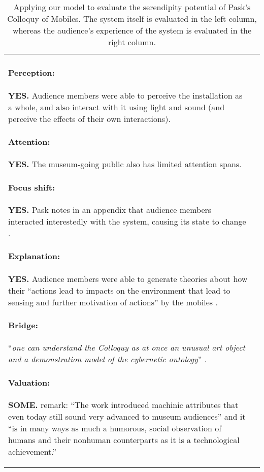 \begin{table}
\begin{mdframed}
\begin{tabular}{@{\hspace{-0.01\textwidth}}p{}@{\hspace{.02\textwidth}}p{}}
\begin{minipage}{.48\textwidth}
\paragraph{Perception:} \textbf{YES.}
Audience members were able to perceive the installation as a whole,
and also interact with it using light and sound (and perceive the
effects of their own interactions). 
\paragraph{Attention:} \textbf{YES.}
The museum-going public also has limited attention spans.
\paragraph{Focus shift:} \textbf{YES.}
Pask notes in an appendix 
that audience members interacted interestedly with the system, causing its state to change \cite[p.~98]{pask1971comment}.
\paragraph{Explanation:} \textbf{YES.}
Audience members were able to generate theories about how
their ``actions lead to impacts on the environment that lead to
sensing and further motivation of actions'' by the mobiles
\cite{haque2007architectural}.
\paragraph{Bridge:} 
``\emph{one can understand the Colloquy as at once an unusual art object and a
demonstration model of the cybernetic ontology}'' \cite[p.~48]{pickering2007ontological}.
\paragraph{Valuation:} \textbf{SOME.}
\citet[p.~5]{gemeinboeck2015performance} remark: ``The work introduced machinic attributes that even
today still sound very advanced to museum audiences'' and it ``is
in many ways as much a humorous, social observation of humans and
their nonhuman counterparts as it is a technological achievement.''
\end{minipage}
\end{tabular}
\end{mdframed}
\caption{Applying our model to evaluate the serendipity potential of Pask's {\sf Colloquy of Mobiles}.  The system itself is evaluated in the left column, whereas the audience's experience of the system is evaluated in the right column. \label{ex:mobiles}}
\end{table}


